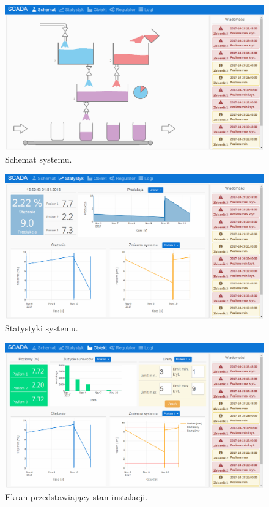 \begin{figure}[H]
	\centering
	\includegraphics[scale = 0.45]{fig/sc1.png}
	\caption{Schemat systemu.}
	\label{fig:sc1}
\end{figure}

\begin{figure}[H]
	\centering
	\includegraphics[scale = 0.45]{fig/sc2.png}
	\caption{Statystyki systemu.}
	\label{fig:sc2}
\end{figure}

\begin{figure}[H]
	\centering
	\includegraphics[scale = 0.5]{fig/sc3.png}
	\caption{Ekran przedstawiający stan instalacji.}
	\label{fig:sc3}
\end{figure}

